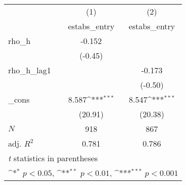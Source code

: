{
\def\sym#1{\ifmmode^{#1}\else\(^{#1}\)\fi}
\begin{tabular}{l*{2}{c}}
\toprule
            &\multicolumn{1}{c}{(1)}&\multicolumn{1}{c}{(2)}\\
            &\multicolumn{1}{c}{estabs\_entry}&\multicolumn{1}{c}{estabs\_entry}\\
\midrule
rho\_h       &      -0.152         &                     \\
            &     (-0.45)         &                     \\
\addlinespace
rho\_h\_lag1  &                     &      -0.173         \\
            &                     &     (-0.50)         \\
\addlinespace
\_cons      &       8.587\sym{***}&       8.547\sym{***}\\
            &     (20.91)         &     (20.38)         \\
\midrule
\(N\)       &         918         &         867         \\
adj. \(R^{2}\)&       0.781         &       0.786         \\
\bottomrule
\multicolumn{3}{l}{\footnotesize \textit{t} statistics in parentheses}\\
\multicolumn{3}{l}{\footnotesize \sym{*} \(p<0.05\), \sym{**} \(p<0.01\), \sym{***} \(p<0.001\)}\\
\end{tabular}
}
